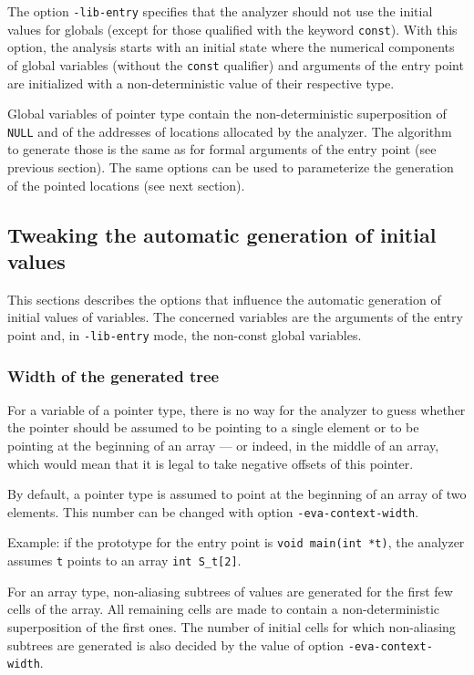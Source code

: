 \documentclass[web]{frama-c-book}
\begin{document}

The option \lstinline|-lib-entry| specifies that the analyzer should not use
the initial values for globals (except for those qualified
with the keyword \lstinline|const|).
With this option, the analysis starts with an initial state 
where the numerical components of
global variables (without the \lstinline|const| qualifier) and arguments
of the entry point are initialized with a non-deterministic value of their
respective type.

Global variables of pointer type contain the non-deterministic
superposition of \lstinline|NULL| and of the addresses of 
locations allocated by the analyzer. The algorithm to generate
those is the same as for formal arguments of the entry point (see previous
section). The same options can be used to parameterize the generation of
the pointed locations (see next section).

\subsection{Tweaking the automatic generation of initial values}
\label{generation_initial}

This sections describes the options that influence 
the automatic generation of initial values
of variables. The concerned
variables are the arguments of the entry point and, 
in \lstinline|-lib-entry| mode, the non-const global variables.

\subsubsection{Width of the generated tree}

For a variable of a pointer type, there is no way for the analyzer 
to guess whether the pointer should be assumed to be pointing to a single
element or to be pointing at the
beginning of an array --- or indeed, in the middle of an array, which
would mean that it is legal to take negative offsets of this pointer.

By default, a pointer type is assumed to point at the beginning
of an array of two elements. This number can be changed with option
\lstinline|-eva-context-width|.

Example: if the prototype for the entry point is \lstinline|void main(int *t)|,
the analyzer assumes \lstinline|t| points to an array \lstinline|int S_t[2]|.

For an array type, non-aliasing subtrees of values
are generated for the first
few cells of the array. All remaining cells are made to contain a
non-deterministic superposition of the first ones. The number
of initial cells for which non-aliasing subtrees are generated is
also decided by the value of option \lstinline|-eva-context-width|.
\end{document}
